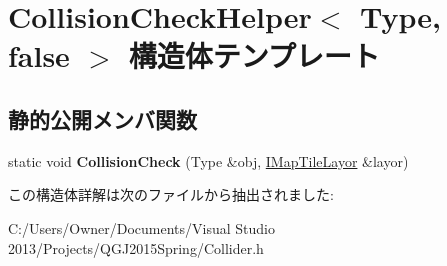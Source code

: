 \hypertarget{struct_collision_check_helper_3_01_type_00_01false_01_4}{}\section{Collision\+Check\+Helper$<$ Type, false $>$ 構造体テンプレート}
\label{struct_collision_check_helper_3_01_type_00_01false_01_4}
\subsection*{静的公開メンバ関数}
\begin{DoxyCompactItemize}
\item 
static void {\bfseries Collision\+Check} (Type \&obj, \hyperlink{class_i_map_tile_layor}{I\+Map\+Tile\+Layor} \&layor)\hypertarget{struct_collision_check_helper_3_01_type_00_01false_01_4_ae6a3c859bae079a69330b108d96b2bbf}{}\label{struct_collision_check_helper_3_01_type_00_01false_01_4_ae6a3c859bae079a69330b108d96b2bbf}

\end{DoxyCompactItemize}


この構造体詳解は次のファイルから抽出されました\+:\begin{DoxyCompactItemize}
\item 
C\+:/\+Users/\+Owner/\+Documents/\+Visual Studio 2013/\+Projects/\+Q\+G\+J2015\+Spring/Collider.\+h\end{DoxyCompactItemize}

